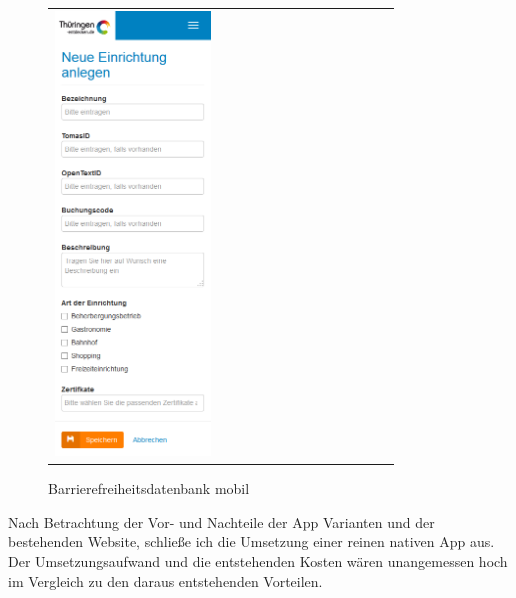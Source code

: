 \begin{figure}[htb]
\begin{tabular}{l r}
		\includegraphics[width=0.49\textwidth]{Bilder/Datenerfassung-mobil}
	\end{tabular}
	\caption{Barrierefreiheitsdatenbank mobil}
\end{figure}

Nach Betrachtung der Vor- und Nachteile der App Varianten und der bestehenden Website, schließe ich die Umsetzung einer reinen nativen App aus. Der Umsetzungsaufwand und die entstehenden Kosten wären unangemessen hoch im Vergleich zu den daraus entstehenden Vorteilen.
